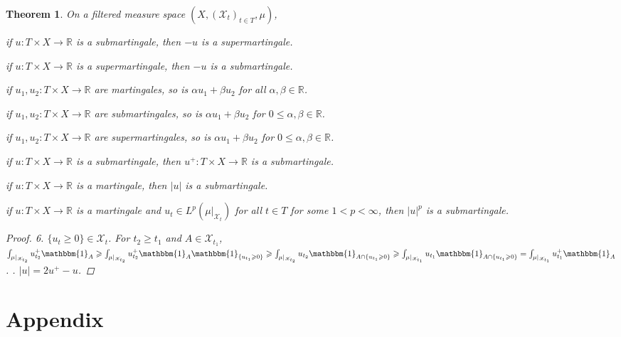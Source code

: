 \documentclass[11pt, a4paper, openany]{book}
\newtheorem{thm}{Theorem}\newtheorem{lem}{Lemma}\newtheorem{crl}{Corollary}
\theoremstyle{definition}
\newenvironment{tight_enumerate}{\begin{enumerate}\itemsep -0.2em}{\end{enumerate}}
\begin{document}
    \begin{thm}
        On a filtered measure space $(X,(\mathscr{X}_t)_{t\in T},\mu)$,
        \begin{tight_enumerate}
            \item if $u:T\times X\rightarrow \mathbb{R}$ is a submartingale, then $-u$ is a supermartingale.
            \item if $u:T\times X\rightarrow \mathbb{R}$ is a supermartingale, then $-u$ is a submartingale.
            \item if $u_1,u_2:T\times X\rightarrow \mathbb{R}$ are martingales, so is $\alpha u_1+\beta u_2$ for all $\alpha,\beta\in \mathbb{R}$.
            \item if $u_1,u_2:T\times X\rightarrow \mathbb{R}$ are submartingales, so is $\alpha u_1+\beta u_2$ for $0\leqslant \alpha,\beta\in \mathbb{R}$.
            \item if $u_1,u_2:T\times X\rightarrow \mathbb{R}$ are supermartingales, so is $\alpha u_1+\beta u_2$ for $0\leqslant \alpha,\beta\in \mathbb{R}$.
            \item if $u:T\times X\rightarrow \mathbb{R}$ is a submartingale, then $u^+:T\times X\rightarrow\mathbb{R}$ is a submartingale.
            \item if $u:T\times X\rightarrow \mathbb{R}$ is a martingale, then $|u|$ is a submartingale.
            \item if $u:T\times X\rightarrow \mathbb{R}$ is a martingale and $u_t\in L^p(\mu|_{\mathscr{X}_t})$ for all $t\in T$ for some $1<p<\infty$, then $|u|^p$ is a submartingale.
        \end{tight_enumerate}
        \begin{proof}
            6. $\{u_t\geqslant 0\}\in\mathscr{X}_t$. For $t_2\geqslant t_1$ and $A\in\mathscr{X}_{t_1}$, $\int_{\mu|_{\mathscr{X}_{t_2}}}u_{t_2}^+\mathbbm{1}_A\geqslant \int_{\mu|_{\mathscr{X}_{t_2}}}u_{t_2}^+\mathbbm{1}_A\mathbbm{1}_{\{u_{t_1}\geqslant 0\}}\geqslant \int_{\mu|_{\mathscr{X}_{t_2}}}u_{t_2}\mathbbm{1}_{A\cap \{u_{t_1}\geqslant 0\}}\geqslant \int_{\mu|_{\mathscr{X}_{t_1}}}u_{t_1}\mathbbm{1}_{A\cap \{u_{t_1}\geqslant 0\}}=\int_{\mu|_{\mathscr{X}_{t_1}}}u_{t_1}^+\mathbbm{1}_{A}$. . $|u|=2u^+-u$.
        \end{proof}
    \end{thm}
\chapter{Appendix}
\end{document}
